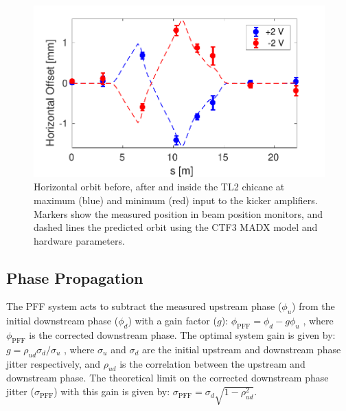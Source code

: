 \documentclass[%
 reprint,
 amsmath,amssymb,
 prl,
]{revtex4-1}
\begin{document}
\begin{figure}
	\includegraphics[width=\columnwidth]{figs/orbClos}
	\caption{\label{fig:orbClos}Horizontal orbit before, 
	after and inside the TL2 chicane at maximum (blue) and 
	minimum (red) 
	input to the kicker amplifiers. Markers show the measured position in beam 
	position monitors, and dashed lines the predicted orbit using the 
	CTF3 MADX model and hardware parameters.}
\end{figure}


\subsection{\label{ss:r56} Phase Propagation}

The PFF system acts to subtract the measured upstream phase (\(\phi_u\)) from 
the initial downstream phase (\(\phi_d\)) with a gain factor (\(g\)):
\(\phi_{\mathrm{PFF}} = \phi_d - g\phi_u\)
, where \(\phi_{\mathrm{PFF}}\) is the corrected downstream phase. The optimal 
system gain is given by:
\(g = \rho_{ud} \sigma_d/\sigma_u\)
, where \(\sigma_u\) and \(\sigma_d\) are the initial upstream and downstream 
phase jitter respectively, and \(\rho_{ud}\) is the correlation between the 
upstream and downstream phase. The theoretical limit on the corrected 
downstream phase jitter (\(\sigma_{\mathrm{PFF}}\)) with this gain is given by:
\(\sigma_{\mathrm{PFF}}=\sigma_d \sqrt{1-\rho_{ud}^2}\). 
\end{document}
